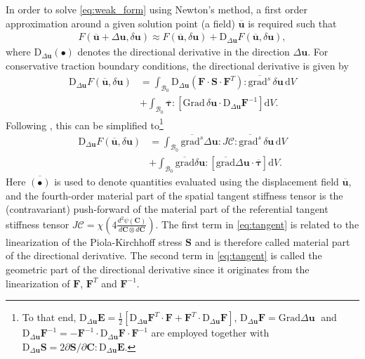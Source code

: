 \documentclass[AMA,STIX1COL]{WileyNJD-v2}
\newcommand*{\gz}[1]{\boldsymbol{#1}}
\newcommand*{\Grad}{\mathrm{Grad}}
\newcommand*{\grad}{\mathrm{grad}}
\renewcommand*{\d}{\mathrm{d}}
\newcommand*{\D}{\mathrm{D}}
\newcommand*{\mcl}[1]{\mathcal{#1}}
\begin{document}
In order to solve \eqref{eq:weak_form} using Newton's method, a first order approximation around a given solution point (a field) $\overline{\gz u}$ is required such that
\begin{align}
F(\overline{\gz u} + \Delta \gz u, \delta \gz u) \approx
F(\overline{\gz u}, \delta \gz u) + \D_{\displaystyle \Delta \gz u} F(\overline{\gz u}, \delta \gz u) ,
\end{align}
where $\D_{\displaystyle \Delta \gz u}(\bullet)$ denotes the directional derivative in the direction $\Delta \gz u$.
For conservative traction boundary conditions, the directional derivative is given by
\begin{equation}
\begin{split}
\D_{\displaystyle \Delta \gz u} F(\overline{\gz u}, \delta \gz u)
&=
\int_{\mcl B_0}
\D_{\displaystyle \Delta \gz u} \left(\gz F \cdot \gz S \cdot \gz F^T\right)  :
\overline{\grad^s} \, \delta \gz u
\, \d V
\\
& +
\int_{\mcl B_0}
\overline{\gz \tau} :
\left[
  \Grad \, \delta \gz u \cdot
  \D_{\displaystyle \Delta \gz u} \gz F^{-1}
\right] \d V.
\end{split}
\label{eq:tangent_pre}
\end{equation}
Following \cite{Wriggers2008}, this can be simplified to\footnote{To that end,
$\!\D_{\displaystyle \Delta \gz u} \gz E = \frac{1}{2}\left[\D_{\displaystyle \Delta \gz u} \gz F^T \cdot \gz F + \gz F^T \cdot \D_{\displaystyle \Delta \gz u} \gz F\right]$, $\D_{\displaystyle \Delta \gz u} \gz F = \Grad \Delta \gz u\;$  and
$\!\D_{\displaystyle \Delta \gz u} \gz F^{-1} = - \gz F^{-1} \cdot \D_{\displaystyle \Delta \gz u} \gz F \cdot \gz F^{-1}$
are employed together with
$\D_{\displaystyle \Delta \gz u} \gz S = 2 \partial \gz S / \partial \gz C : \D_{\displaystyle \Delta \gz u} \gz E$.
}
\begin{equation}
  \begin{split}
\D_{\displaystyle \Delta \gz u} F(\overline{\gz u}, \delta \gz u)
  &=
  \int_{\mcl B_0} \overline{\grad^s} \Delta \gz u : J \boldsymbol{\mathcal{C}} : \overline{\grad^s} \, \delta \gz u \, \d V \\
  &+
  \int_{\mcl B_0}
  \overline{\grad}\delta \gz u :
  \left[
  \overline{\grad} \Delta \gz u \cdot
  \overline{\gz \tau}
  \right]
  \d V.
\end{split}
\label{eq:tangent}
\end{equation}
Here $\overline{(\bullet)}$ is used to denote quantities evaluated using the displacement field $\overline {\gz u}$,
and the fourth-order material part of the spatial tangent stiffness tensor is the (contravariant) push-forward of the material part of the referential tangent stiffness tensor
$J \boldsymbol{\mathcal{C}} = \chi\left( 4 \frac{d^{2} \psi \left( \mathbf{C} \right)}{d \mathbf{C} \otimes d \mathbf{C}} \right)$.
The first term in \eqref{eq:tangent} is related to the linearization of the Piola-Kirchhoff stress $\gz S$ and is therefore called material part of the directional derivative.
The second term in \eqref{eq:tangent} is called the geometric part of the directional derivative since it originates from the linearization of $\gz F$, $\gz F^T$ and $\gz F^{-1}$.
\end{document}

